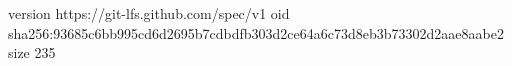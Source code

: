 version https://git-lfs.github.com/spec/v1
oid sha256:93685c6bb995cd6d2695b7cdbdfb303d2ce64a6c73d8eb3b73302d2aae8aabe2
size 235
